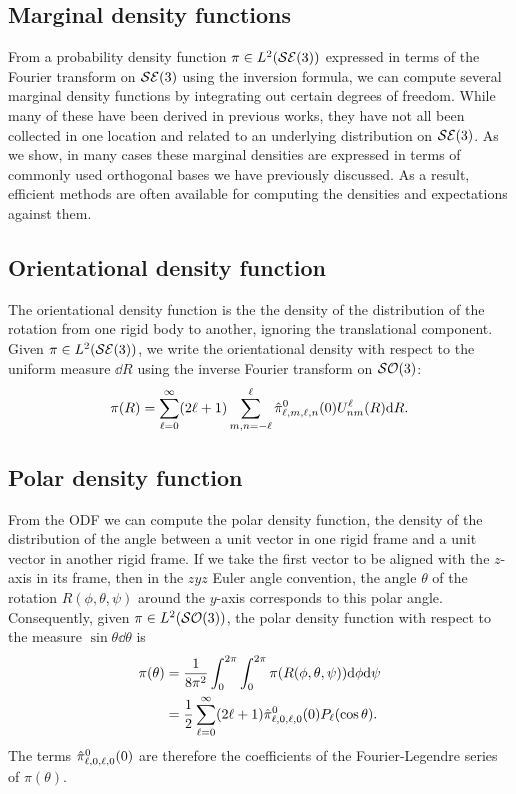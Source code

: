 \documentclass[../../main.tex]{subfiles}
\begin{document}
\begin{refsection}
	\section{Marginal density functions}

	From a probability density function $\pi \in L^2(\mathcal{SE} (3))$ expressed in terms of the Fourier transform on $\mathcal{SE} (3)$ using the inversion formula, we can compute several marginal density functions by integrating out certain degrees of freedom.
	While many of these have been derived in previous works, they have not all been collected in one location and related to an underlying distribution on $\mathcal{SE} (3)$.
	As we show, in many cases these marginal densities are expressed in terms of commonly used orthogonal bases we have previously discussed.
	As a result, efficient methods are often available for computing the densities and expectations against them.

	\subsection{Orientational density function}

	The orientational density function is the the density of the distribution of the rotation from one rigid body to another, ignoring the translational component.
	Given $\pi \in L^2(\mathcal{SE} (3))$, we write the orientational density with respect to the uniform measure $\dd R$ using the inverse Fourier transform on $\mathcal{SO} (3)$:
	\begin{equation}
		\pi(R) = \sum_{\ell=0}^\infty (2\ell+1) \sum_{m,n=-\ell}^\ell \hat{\pi}^0_{\ell,m,\ell,n}(0) U^\ell_{nm}(R) \dd R.
	\end{equation}

	\subsection{Polar density function}

	From the ODF we can compute the polar density function, the density of the distribution of the angle between a unit vector in one rigid frame and a unit vector in another rigid frame.
	If we take the first vector to be aligned with the $z$-axis in its frame, then in the $zyz$ Euler angle convention, the angle $\theta$ of the rotation $R(\phi,\theta,\psi)$ around the $y$-axis corresponds to this polar angle.
	Consequently, given $\pi \in L^2(\mathcal{SO} (3))$, the polar density function with respect to the measure $\sin\theta \dd\theta$ is
	\begin{align}
		\pi(\theta) & = \frac{1}{8\pi^2} \int_0^{2\pi} \int_0^{2\pi} \pi(R(\phi,\theta,\psi)) \dd\phi \dd\psi \label{polar_dens_def}             \\
		            & = \frac{1}{2} \sum_{\ell=0}^\infty (2\ell+1) \hat{\pi}^0_{\ell,0,\ell,0}(0) P_\ell(\cos\theta). \label{polar_dens_ftrans}
	\end{align}
	The terms $\hat{\pi}^0_{\ell,0,\ell,0}(0)$ are therefore the coefficients of the Fourier-Legendre series of $\pi(\theta)$.


\end{refsection}
\end{document}
